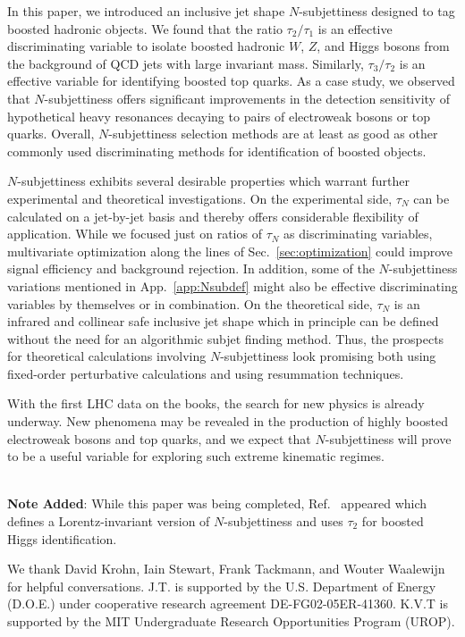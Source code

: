 \documentclass{JHEP3}
\DeclareRobustCommand{\Sec}[1]{Sec.~\ref{#1}}
\DeclareRobustCommand{\App}[1]{App.~\ref{#1}}
\DeclareRobustCommand{\Ref}[1]{Ref.~\cite{#1}}
\begin{document}
In this paper, we introduced an inclusive jet shape $N$-subjettiness designed to tag boosted hadronic objects.  We found that the ratio $\tau_2 / \tau_1$ is an effective discriminating variable to isolate boosted hadronic $W$, $Z$, and Higgs bosons from the background of QCD jets with large invariant mass.  Similarly, $\tau_3 / \tau_2$ is an effective variable for identifying boosted top quarks.   As a case study, we observed that $N$-subjettiness offers significant improvements in the detection sensitivity of hypothetical heavy resonances decaying to pairs of electroweak bosons or top quarks.  Overall, $N$-subjettiness selection methods are at least as good as other commonly used discriminating methods for identification of boosted objects.

$N$-subjettiness exhibits several desirable properties which warrant further experimental and theoretical investigations.  On the experimental side, $\tau_N$ can be calculated on a jet-by-jet basis and thereby offers considerable flexibility of application.  While we focused just on ratios of $\tau_N$ as discriminating variables, multivariate optimization along the lines of \Sec{sec:optimization} could improve signal efficiency and background rejection.  In addition, some of the $N$-subjettiness variations mentioned in \App{app:Nsubdef} might also be effective discriminating variables by themselves or in combination.   On the theoretical side, $\tau_N$ is an infrared and collinear safe inclusive jet shape which in principle can be defined without the need for an algorithmic subjet finding method.  Thus, the prospects for theoretical calculations involving $N$-subjettiness look promising both using fixed-order perturbative calculations and using resummation techniques.

With the first LHC data on the books, the search for new physics is already underway.  New phenomena may be revealed in the production of highly boosted electroweak bosons and top quarks, and we expect that $N$-subjettiness will prove to be a useful variable for exploring such extreme kinematic regimes.

~\\

\noindent  \textbf{Note Added}:  While this paper was being completed, \Ref{Kim:2010uj} appeared which defines a Lorentz-invariant version of $N$-subjettiness and uses $\tau_2$ for boosted Higgs identification. 

\acknowledgments
We thank David Krohn, Iain Stewart, Frank Tackmann, and Wouter Waalewijn for helpful conversations.  J.T. is supported by the U.S. Department of Energy (D.O.E.) under cooperative research agreement DE-FG02-05ER-41360.  K.V.T is supported by the MIT Undergraduate Research Opportunities Program (UROP).
\end{document}
